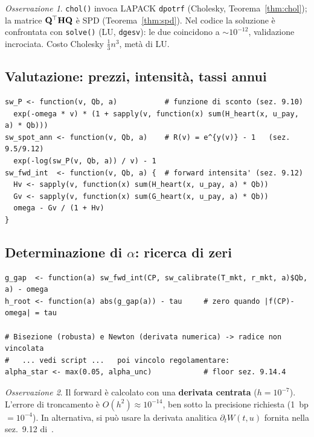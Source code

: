 \documentclass[11pt,a4paper]{article}
\theoremstyle{plain}
\theoremstyle{definition}
\theoremstyle{remark}
\newtheorem*{osservazione}{Osservazione}
\newcommand{\Hmat}{\mathbf{H}}
\newcommand{\Qmat}{\mathbf{Q}}
\newcommand{\transp}{^{\mskip-1mu\top}}
\begin{document}
\begin{osservazione}
\texttt{chol()} invoca LAPACK \texttt{dpotrf} (Cholesky, Teorema~\ref{thm:chol});
la matrice $\Qmat\transp\Hmat\Qmat$ è SPD (Teorema~\ref{thm:spd}). Nel codice la
soluzione è confrontata con \texttt{solve()} (LU, \texttt{dgesv}): le due coincidono
a $\sim 10^{-12}$, validazione incrociata. Costo Cholesky $\tfrac13 n^3$, metà di LU.
\end{osservazione}

\subsection{Valutazione: prezzi, intensità, tassi annui}

\begin{codebox}
\begin{Verbatim}[fontsize=\small]
sw_P <- function(v, Qb, a)           # funzione di sconto (sez. 9.10)
  exp(-omega * v) * (1 + sapply(v, function(x) sum(H_heart(x, u_pay, a) * Qb)))
sw_spot_ann <- function(v, Qb, a)    # R(v) = e^{y(v)} - 1   (sez. 9.5/9.12)
  exp(-log(sw_P(v, Qb, a)) / v) - 1
sw_fwd_int  <- function(v, Qb, a) {  # forward intensita' (sez. 9.12)
  Hv <- sapply(v, function(x) sum(H_heart(x, u_pay, a) * Qb))
  Gv <- sapply(v, function(x) sum(G_heart(x, u_pay, a) * Qb))
  omega - Gv / (1 + Hv)
}
\end{Verbatim}
\end{codebox}

\subsection{Determinazione di $\alpha$: ricerca di zeri}

\begin{codebox}[Bisezione e Newton su $g(\alpha)=\tau$ --- Algoritmo~\ref{alg:alpha}]
\begin{Verbatim}[fontsize=\small]
g_gap  <- function(a) sw_fwd_int(CP, sw_calibrate(T_mkt, r_mkt, a)$Qb, a) - omega
h_root <- function(a) abs(g_gap(a)) - tau     # zero quando |f(CP)-omega| = tau

# Bisezione (robusta) e Newton (derivata numerica) -> radice non vincolata
#   ... vedi script ...   poi vincolo regolamentare:
alpha_star <- max(0.05, alpha_unc)            # floor sez. 9.14.4
\end{Verbatim}
\end{codebox}

\begin{osservazione}
Il forward \`e calcolato con una \textbf{derivata centrata}
($h = 10^{-7}$). L'errore di troncamento \`e $O(h^2) \approx 10^{-14}$,
ben sotto la precisione richiesta (1~bp $= 10^{-4}$). In alternativa,
si pu\`o usare la derivata analitica $\partial_t W(t,u)$ fornita nella sez.~9.12
di~\cite{eiopa2025}.
\end{osservazione}
\end{document}
